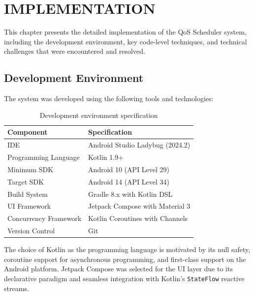 
\chapter{IMPLEMENTATION}
\label{chap:implementation}

This chapter presents the detailed implementation of the QoS Scheduler system, including the development environment, key code-level techniques, and technical challenges that were encountered and resolved.

\section{Development Environment}
\label{sec:dev_environment}

The system was developed using the following tools and technologies:

\begin{table}[H]
\centering
\caption{Development environment specification}
\label{tab:dev_env}
\begin{tabular}{@{}ll@{}}
\toprule
\textbf{Component} & \textbf{Specification} \\
\midrule
IDE                     & Android Studio Ladybug (2024.2) \\
Programming Language    & Kotlin 1.9+ \\
Minimum SDK             & Android 10 (API Level 29) \\
Target SDK              & Android 14 (API Level 34) \\
Build System            & Gradle 8.x with Kotlin DSL \\
UI Framework            & Jetpack Compose with Material 3 \\
Concurrency Framework   & Kotlin Coroutines with Channels \\
Version Control         & Git \\
\bottomrule
\end{tabular}
\end{table}

The choice of Kotlin as the programming language is motivated by its null safety, coroutine support for asynchronous programming, and first-class support on the Android platform. Jetpack Compose was selected for the UI layer due to its declarative paradigm and seamless integration with Kotlin's \texttt{StateFlow} reactive streams.

